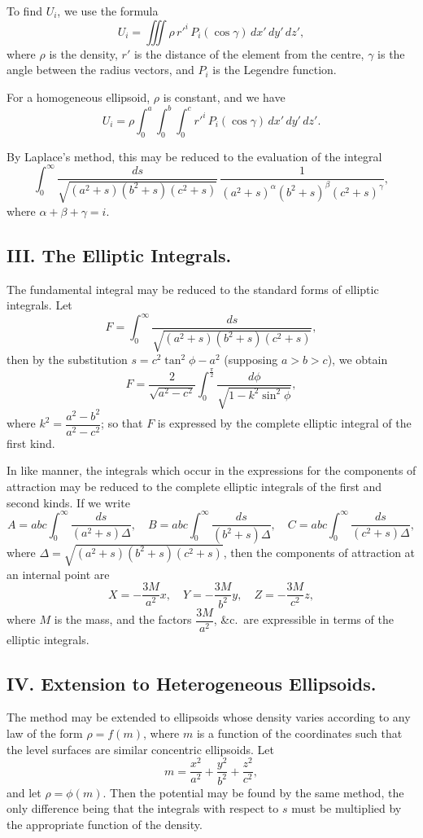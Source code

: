 \documentclass[11pt,a4paper]{book}
\begin{document}
To find $U_i$, we use the formula
\[
U_i = \iiint \rho\, r'^i\, P_i(\cos\gamma)\, dx'\,dy'\,dz',
\]
where $\rho$ is the density, $r'$ is the distance of the element from the centre, $\gamma$ is the angle between the radius vectors, and $P_i$ is the Legendre function.

For a homogeneous ellipsoid, $\rho$ is constant, and we have
\[
U_i = \rho \int_0^a \int_0^b \int_0^c r'^i\, P_i(\cos\gamma)\, dx'\,dy'\,dz'.
\]

By Laplace's method, this may be reduced to the evaluation of the integral
\[
\int_0^\infty \frac{ds}{\sqrt{(a^2+s)(b^2+s)(c^2+s)}}\, \frac{1}{(a^2+s)^{\alpha}(b^2+s)^{\beta}(c^2+s)^{\gamma}},
\]
where $\alpha+\beta+\gamma=i$.

\subsection*{III. The Elliptic Integrals.}

The fundamental integral may be reduced to the standard forms of elliptic integrals. Let
\[
F = \int_0^\infty \frac{ds}{\sqrt{(a^2+s)(b^2+s)(c^2+s)}},
\]
then by the substitution $s=c^2\tan^2\phi-a^2$ (supposing $a>b>c$), we obtain
\[
F = \frac{2}{\sqrt{a^2-c^2}} \int_0^{\frac{\pi}{2}} \frac{d\phi}{\sqrt{1-k^2\sin^2\phi}},
\]
where $k^2=\dfrac{a^2-b^2}{a^2-c^2}$; so that $F$ is expressed by the complete elliptic integral of the first kind.

In like manner, the integrals which occur in the expressions for the components of attraction may be reduced to the complete elliptic integrals of the first and second kinds. If we write
\[
A = abc \int_0^\infty \frac{ds}{(a^2+s)\Delta},\quad
B = abc \int_0^\infty \frac{ds}{(b^2+s)\Delta},\quad
C = abc \int_0^\infty \frac{ds}{(c^2+s)\Delta},
\]
where $\Delta=\sqrt{(a^2+s)(b^2+s)(c^2+s)}$, then the components of attraction at an internal point are
\[
X = -\frac{3M}{a^2}x,\quad Y = -\frac{3M}{b^2}y,\quad Z = -\frac{3M}{c^2}z,
\]
where $M$ is the mass, and the factors $\dfrac{3M}{a^2}$, \&c.\ are expressible in terms of the elliptic integrals.

\subsection*{IV. Extension to Heterogeneous Ellipsoids.}

The method may be extended to ellipsoids whose density varies according to any law of the form $\rho=f(m)$, where $m$ is a function of the coordinates such that the level surfaces are similar concentric ellipsoids. Let
\[
m = \frac{x^2}{a^2} + \frac{y^2}{b^2} + \frac{z^2}{c^2},
\]
and let $\rho=\phi(m)$. Then the potential may be found by the same method, the only difference being that the integrals with respect to $s$ must be multiplied by the appropriate function of the density.
\end{document}
